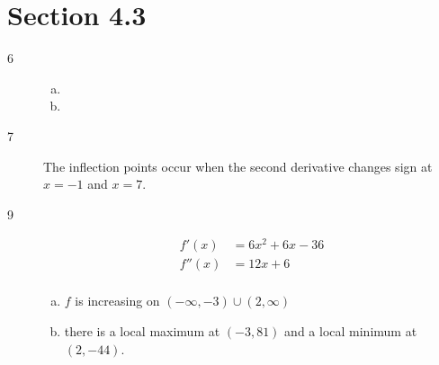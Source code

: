 \documentclass[letterpaper, landscape]{exam}
\begin{document}
  \section{Section 4.3} %
  
  \begin{description}

    \item[6] 

      \begin{enumerate}[(a)]
        \item 
          
        \item 
      \end{enumerate}

    \item[7] The inflection points occur when the second derivative changes sign at 
      $x = -1$ and $x = 7$.

    \newpage

    \item[9]

      \begin{align*}
        f'(x)  & = 6x^2 + 6x - 36 \\
        f''(x) & = 12x + 6 \\
      \end{align*}

      \begin{enumerate}[(a)]
        \item $f$ is increasing on $(-\infty, -3) \cup (2, \infty)$

        \item there is a local maximum at $(-3, 81)$ and a local minimum at
          $(2, -44)$.


\end{enumerate}
\end{description}
\end{document}
